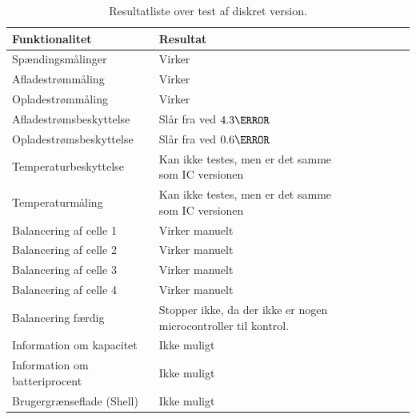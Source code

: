 \begin{table}[h!]
	\small
	\centering
	\begin{threeparttable}
		\begin{tabular}{ l l l l l l l }
			\toprule
			\multicolumn{1}{l}{\textbf{Funktionalitet}}          &
			\multicolumn{1}{l}{\textbf{Resultat}}           \\
			\hline
			Spændingsmålinger              & Virker                         \\
			Afladestrømmåling                    		& Virker                         \\
			Opladestrømmåling                    		& Virker                         \\
			Afladestrømsbeskyttelse		& Slår fra ved $4.3\ampere$        \\
			Opladestrømsbeskyttelse   	& Slår fra ved $0.6\ampere$      \\
			Temperaturbeskyttelse          & Kan ikke testes, men er det samme som IC versionen          \\
			Temperaturmåling                    		& Kan ikke testes, men er det samme som IC versionen    \\
			Balancering af celle 1         & Virker manuelt                         \\
			Balancering af celle 2        & Virker manuelt                        \\
			Balancering af celle 3        & Virker manuelt                        \\			
			Balancering af celle 4        & Virker manuelt                        \\
			Balancering færdig             & Stopper ikke, da der ikke er nogen microcontroller til kontrol.               \\
			Information om kapacitet       & Ikke muligt                          \\
			Information om batteriprocent 							& Ikke muligt			 \\
			Brugergrænseflade (Shell)                       & Ikke muligt                    \\
			
			\bottomrule
		\end{tabular}
		\caption{Resultatliste over test af diskret version.}
		\label{tab:resultat_diskret}
	\end{threeparttable}
\end{table} 
\FloatBlock

